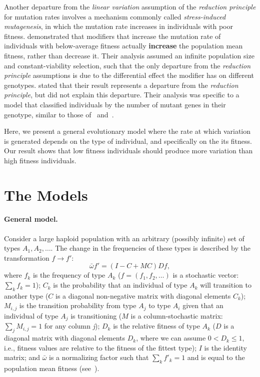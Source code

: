 \documentclass[9pt, a4paper, twocolumn]{extarticle}
\begin{document}
Another departure from the \emph{linear variation} assumption of the \emph{reduction principle} for mutation rates involves a mechanism commonly called \emph{stress-induced mutagenesis}, in which the mutation rate increases in individuals with poor fitness.
\citet{Ram2012} demonstrated that modifiers that increase the mutation rate of individuals with below-average fitness actually \textbf{increase} the population mean fitness, rather than decrease it.
Their analysis assumed an infinite population size and constant-viability selection, such that the only departure from the \emph{reduction principle} assumptions is due to the differential effect the modifier has on different genotypes.
\citet{Ram2012} stated that their result represents a departure from the \emph{reduction principle}, but did not explain this departure.
Their analysis was specific to a model that classified individuals by the number of mutant genes in their genotype, similar to those of~\citet{Kimura1966a} and~\citet{Haigh1978}. 

Here, we present a general evolutionary model where the rate at which variation is generated depends on the type of individual, and specifically on the its fitness.
Our result shows that low fitness individuals should produce more variation than high fitness individuals.

\section*{The Models}

\paragraph*{General model.}
Consider a large haploid population with an arbitrary (possibly infinite) set of types $A_1, A_2, \ldots$.
The change in the frequencies of these types is described by the transformation $f \to f'$: 
\begin{equation}\label{eq:model}
\bar{\omega} f' = (I-C+MC)D f,
\end{equation}
where $f_k$ is the frequency of type $A_k$ ($f=(f_1, f_2, \ldots)$ is a stochastic vector: $\sum_k{f_k} = 1$);
$C_k$ is the probability that an individual of type $A_k$ will transition to another type ($C$ is a diagonal non-negative matrix with diagonal elements $C_k$);
$M_{i,j}$ is the transition probability from type $A_j$ to type $A_i$ given that an individual of type $A_j$ is transitioning ($M$ is a column-stochastic matrix: $\sum_j {M_{i,j}} = 1$ for any column \emph{j}); 
$D_k$ is the relative fitness of type $A_k$ ($D$ is a diagonal matrix with diagonal elements $D_k$, where we can assume $0 < D_k \le 1$, i.e., fitness values are relative to the fitness of the fittest type); 
$I$ is the identity matrix;
and $\bar{\omega}$ is a normalizing factor such that $\sum_k{f'_k}=1$ and is equal to the population mean fitness (see~).
\end{document}
